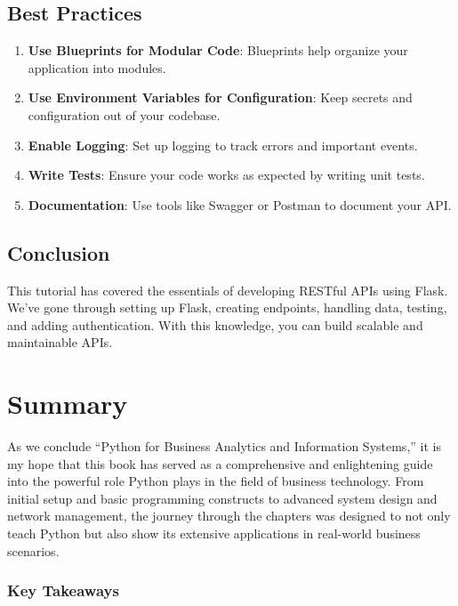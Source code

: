 \documentclass[
  letterpaper,
  DIV=11,
  numbers=noendperiod]{scrreprt}
\providecommand{\tightlist}{%
  \setlength{\itemsep}{0pt}\setlength{\parskip}{0pt}}\usepackage{longtable,booktabs,array}
\begin{document}
\section{Best Practices}\label{best-practices-4}

\begin{enumerate}
\def\labelenumi{\arabic{enumi}.}
\tightlist
\item
  \textbf{Use Blueprints for Modular Code}: Blueprints help organize
  your application into modules.
\item
  \textbf{Use Environment Variables for Configuration}: Keep secrets and
  configuration out of your codebase.
\item
  \textbf{Enable Logging}: Set up logging to track errors and important
  events.
\item
  \textbf{Write Tests}: Ensure your code works as expected by writing
  unit tests.
\item
  \textbf{Documentation}: Use tools like Swagger or Postman to document
  your API.
\end{enumerate}

\section{Conclusion}\label{conclusion-43}

This tutorial has covered the essentials of developing RESTful APIs
using Flask. We've gone through setting up Flask, creating endpoints,
handling data, testing, and adding authentication. With this knowledge,
you can build scalable and maintainable APIs.


\chapter{Summary}\label{summary}

As we conclude ``Python for Business Analytics and Information
Systems,'' it is my hope that this book has served as a comprehensive
and enlightening guide into the powerful role Python plays in the field
of business technology. From initial setup and basic programming
constructs to advanced system design and network management, the journey
through the chapters was designed to not only teach Python but also show
its extensive applications in real-world business scenarios.

\subsection{Key Takeaways}\label{key-takeaways}
\end{document}
